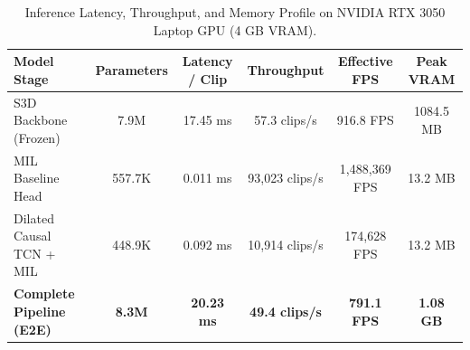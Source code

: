 \begin{table}[ht]
\centering
\caption{Inference Latency, Throughput, and Memory Profile on NVIDIA RTX 3050 Laptop GPU (4 GB VRAM).}
\label{tab:efficiency_benchmark}
\begin{tabular}{lccccc}
\hline
\textbf{Model Stage} & \textbf{Parameters} & \textbf{Latency / Clip} & \textbf{Throughput} & \textbf{Effective FPS} & \textbf{Peak VRAM} \\
\hline
S3D Backbone (Frozen) & 7.9M & 17.45 ms & 57.3 clips/s & 916.8 FPS & 1084.5 MB \\
MIL Baseline Head & 557.7K & 0.011 ms & 93,023 clips/s & 1,488,369 FPS & 13.2 MB \\
Dilated Causal TCN + MIL & 448.9K & 0.092 ms & 10,914 clips/s & 174,628 FPS & 13.2 MB \\
\hline
\textbf{Complete Pipeline (E2E)} & \textbf{8.3M} & \textbf{20.23 ms} & \textbf{49.4 clips/s} & \textbf{791.1 FPS} & \textbf{1.08 GB} \\
\hline
\end{tabular}
\end{table}

